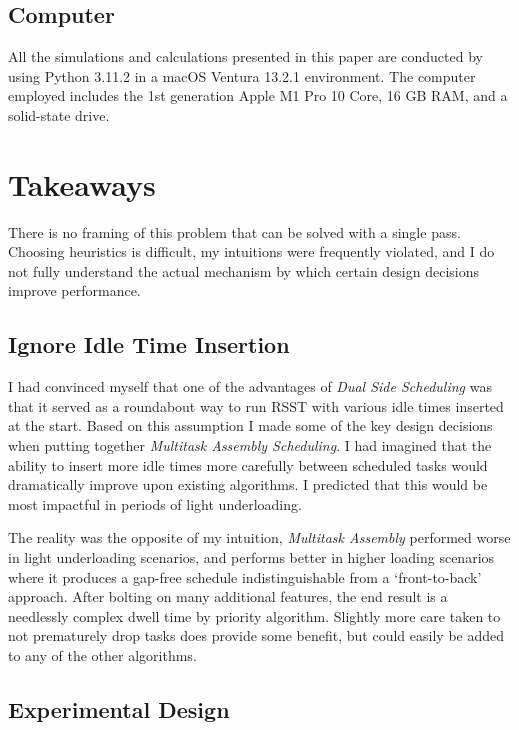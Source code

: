 \documentclass[conference]{IEEEtran}
\begin{document}
\subsection{Computer}

All the simulations and calculations presented in this paper are conducted by using Python 3.11.2 in a macOS Ventura 13.2.1 environment.
The computer employed includes the 1st generation Apple M1 Pro 10 Core, 16 GB RAM, and a solid-state drive.

\section{Takeaways}

There is no framing of this problem that can be solved with a single pass.
Choosing heuristics is difficult, my intuitions were frequently violated, and I do not fully understand the actual mechanism by which certain design decisions improve performance.

\subsection{Ignore Idle Time Insertion}

I had convinced myself that one of the advantages of \emph{Dual Side Scheduling} was that it served as a roundabout way to run RSST with various idle times inserted at the start.
Based on this assumption I made some of the key design decisions when putting together \emph{Multitask Assembly Scheduling}.
I had imagined that the ability to insert more idle times more carefully between scheduled tasks would dramatically improve upon existing algorithms.
I predicted that this would be most impactful in periods of light underloading.

The reality was the opposite of my intuition, \emph{Multitask Assembly} performed worse in light underloading scenarios, and performs better in higher loading scenarios where it produces a gap-free schedule indistinguishable from a `front-to-back' approach.
After bolting on many additional features, the end result is a needlessly complex dwell time by priority algorithm.
Slightly more care taken to not prematurely drop tasks does provide some benefit, but could easily be added to any of the other algorithms.

\subsection{Experimental Design}
\end{document}
